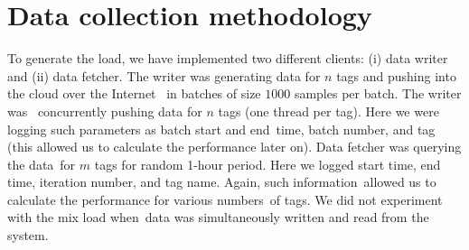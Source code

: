 \section{Data collection methodology}
\label{section:experiments}

To generate the load, we have implemented two different clients: 
(i) data writer and (ii) data fetcher. The writer was generating 
data for $n$ tags and pushing into the cloud over the Internet 
in batches of size $1000$ samples per batch. The writer was 
concurrently pushing data for $n$ tags (one thread per tag). 
Here we were logging such parameters as batch start and end time, 
batch number, and tag (this allowed us to calculate the performance 
later on). Data fetcher was querying the data for $m$ tags for 
random 1-hour period. Here we logged start time, end time, iteration number, 
and tag name. Again, such information allowed us to calculate the 
performance for various numbers of tags. We did not experiment with 
the mix load when data was simultaneously written and read from the system.
